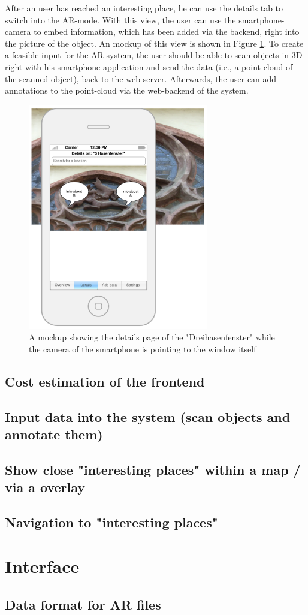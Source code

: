 After an user has reached an interesting place, he can use the details tab to switch into the \ac{AR}-mode. With this view, the user can use the smartphone-camera to embed information, which has been added via the backend, right into the picture of the object. An mockup of this view is shown in Figure \ref{app2}. 
To create a feasible input for the \ac{AR} system, the user should be able to scan objects in 3D right with his smartphone application and send the data (i.e., a point-cloud of the scanned object), back to the web-server.  Afterwards, the user can add annotations to the point-cloud via the web-backend of the system.  

\begin{figure}[th]
\centerline{\includegraphics[width=0.7\textwidth]{gfx/mockup_app_2}}
\caption{A mockup showing the details page of the "Dreihasenfenster" while the camera of the smartphone is pointing to the window itself}
\label{app2}
\end{figure}

\subsection{Cost estimation of the frontend}				
  
\subsection{Input data into the system (scan objects and annotate them)} 

\subsection{Show close "interesting places" within a map /  via a overlay} 

\subsection{Navigation to "interesting places"}
				
\section{Interface}							 

\subsection{Data format for \ac{AR} files}